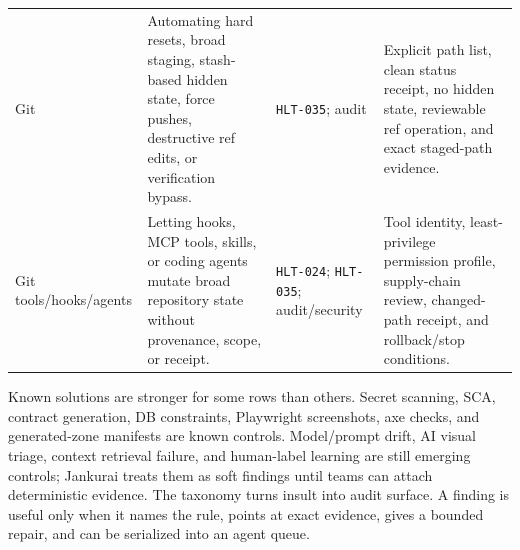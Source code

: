 \begin{table}[t]
\begin{tabularx}{\textwidth}{L{0.13\textwidth} Y L{0.18\textwidth} Y}
Git & Automating hard resets, broad staging, stash-based hidden state, force pushes, destructive ref edits, or verification bypass. & \texttt{HLT-035}; audit & Explicit path list, clean status receipt, no hidden state, reviewable ref operation, and exact staged-path evidence. \\
Git tools/hooks/agents & Letting hooks, MCP tools, skills, or coding agents mutate broad repository state without provenance, scope, or receipt. & \texttt{HLT-024}; \texttt{HLT-035}; audit/security & Tool identity, least-privilege permission profile, supply-chain review, changed-path receipt, and rollback/stop conditions. \\
\bottomrule
\end{tabularx}
\end{table}

\begin{center}
\end{center}

Known solutions are stronger for some rows than others. Secret scanning, SCA, contract generation, DB constraints, Playwright screenshots, axe checks, and generated-zone manifests are known controls. Model/prompt drift, AI visual triage, context retrieval failure, and human-label learning are still emerging controls; Jankurai treats them as soft findings until teams can attach deterministic evidence. The taxonomy turns insult into audit surface. A finding is useful only when it names the rule, points at exact evidence, gives a bounded repair, and can be serialized into an agent queue.
